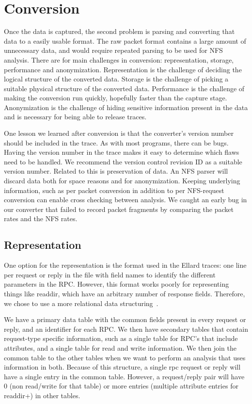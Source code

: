 \section{Conversion}
\label{sec:conversion}

Once the data is captured, the second problem is parsing and
converting that data to a easily usable format.  The raw packet format
contains a large amount of unnecessary data, and would require
repeated parsing to be used for NFS analysis.  There are for main
challenges in conversion: representation, storage, performance and
anonymization.  Representation is the challenge of deciding the
logical structure of the converted data.  Storage is the challenge of
picking a suitable physical structure of the converted data.
Performance is the challenge of making the conversion run quickly,
hopefully faster than the capture stage.  Anonymization is the
challenge of hiding sensitive information present in the data and is
necessary for being able to release traces.

One lesson we learned after conversion is that the converter's version
number should be included in the trace.  As with most programs, there
can be bugs.  Having the version number in the trace makes it easy to
determine which flaws need to be handled.  We recommend the version
control revision ID as a suitable version number.  Related to this is
preservation of data.  An NFS parser will discard data both for space
reasons and for anonymization.  Keeping underlying information, such as
per packet conversion in addition to per NFS-request conversion can
enable cross checking between analysis.  We caught an early bug in our
converter that failed to record packet fragments by comparing the
packet rates and the NFS rates.  

\subsection{Representation}

One option for the representation is the format used in the
Ellard\cite{ellardTraces} traces: one line per request or reply in the
file with field names to identify the different parameters in the RPC.
However, this format works poorly for representing things like
readdir, which have an arbitrary number of response fields.
Therefore, we chose to use a more relational data
structuring~\cite{codd70relational}.  

We have a primary data table with the common fields present in every
request or reply, and an identifier for each RPC.  We then have
secondary tables that contain request-type specific information, such
as a single table for RPC's that include attributes, and a single
table for read and write information.  We then join the common table
to the other tables when we want to perform an analysis that uses
information in both.  Because of this structure, a single rpc request
or reply will have a single entry in the common table.  However, a
request/reply pair will have 0 (non read/write for that table) or more
entries (multiple attribute entries for readdir+) in other tables.

